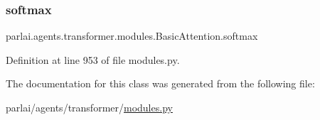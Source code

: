 \subsubsection{\texorpdfstring{softmax}{softmax}}
{\footnotesize\ttfamily parlai.\+agents.\+transformer.\+modules.\+Basic\+Attention.\+softmax}



Definition at line 953 of file modules.\+py.



The documentation for this class was generated from the following file\+:\begin{DoxyCompactItemize}
\item 
parlai/agents/transformer/\hyperlink{parlai_2agents_2transformer_2modules_8py}{modules.\+py}\end{DoxyCompactItemize}
